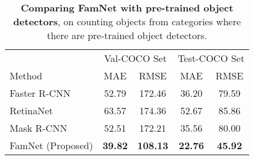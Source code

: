 \setlength{\tabcolsep}{3pt}
\begin{table}[!t]
\centering
\begin{tabular}{lcccc}
\toprule
          &  \multicolumn{2}{c}{ Val-COCO Set} &  \multicolumn{2}{c}{ Test-COCO Set} \\
         \cmidrule(lr){2-3} \cmidrule(lr){4-5} 
    Method &  MAE          & RMSE    & MAE          & RMSE         \\

\midrule 
Faster R-CNN & 52.79 & 172.46 & 36.20 & 79.59 \\
RetinaNet & 63.57 & 174.36 & 52.67 & 85.86 \\
Mask R-CNN & 52.51 & 172.21 & 35.56 & 80.00 \\
FamNet (Proposed)  & \textbf{39.82} & \textbf{108.13} & \textbf{22.76} & \textbf{45.92}  \\

\bottomrule 
\end{tabular}
\vskip -0.1in
\caption{{\bf Comparing FamNet with pre-trained object detectors}, on counting objects from categories where there are pre-trained object detectors. 
\label{tab:detectors}}
\end{table}

